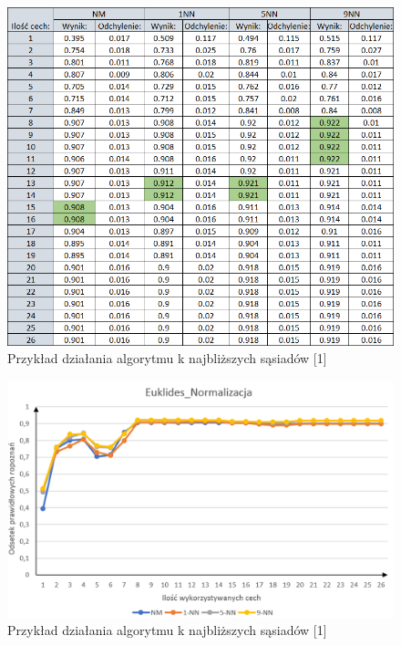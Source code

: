 \documentclass[12pt]{article}
\begin{document}
\begin{figure}[H]
	\centering
		\includegraphics[scale=0.8]{images/algorithms/euklides_norm_tab.png}
	\caption{Przykład działania algorytmu k najbliższych sąsiadów [1]}
\end{figure}

\begin{figure}[H]
	\centering
		\includegraphics[scale=0.66]{images/algorithms/euklides_norm.png}
	\caption{Przykład działania algorytmu k najbliższych sąsiadów [1]}
\end{figure}
\end{document}
